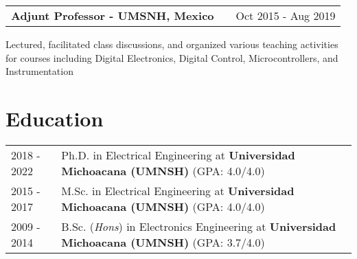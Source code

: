 \documentclass[a4paper,10pt]{article}
\makeatletter
\newenvironment{jobshort}[2]
    {
    \begin{tabularx}{\linewidth}{@{}l X r@{}}
    \textbf{#1} & \hfill &  #2 \\[3.75pt]
    \end{tabularx}
    }
    {
    }
\makeatother
\begin{document}
\begin{jobshort}{Adjunt Professor - UMSNH, Mexico}{Oct 2015 - Aug 2019}
Lectured, facilitated class discussions, and organized various teaching activities for courses including Digital Electronics, Digital Control, Microcontrollers, and Instrumentation
\end{jobshort}




\section{Education}
\begin{tabularx}{\linewidth}{@{}l X@{}}	
2018 - 2022 & Ph.D. in Electrical Engineering  at \textbf{Universidad Michoacana (UMNSH)} \hfill \normalsize (GPA: 4.0/4.0) \\

2015 - 2017 & M.Sc. in Electrical Engineering at \textbf{Universidad Michoacana (UMNSH)} \hfill (GPA: 4.0/4.0) \\ 

2009 - 2014 & B.Sc. (\textit{Hons}) in Electronics Engineering at \textbf{Universidad Michoacana (UMNSH)} \hfill (GPA: 3.7/4.0) \\ 
\end{tabularx}

\end{document}
